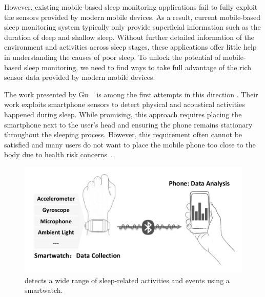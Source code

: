 However, existing mobile-based sleep monitoring applications fail to fully exploit the sensors provided by modern mobile devices. As a
result, current mobile-based sleep monitoring system typically only provide superficial information such as the duration of deep and
shallow sleep. Without further detailed information of the environment and activities across sleep stages, these applications offer little
help in understanding the causes of poor sleep. To unlock the potential of mobile-based sleep monitoring, we need to find ways to take full
advantage of the rich sensor data provided by modern mobile devices.


The work presented by Gu \etal~\cite{gu2016sleep} is among the first attempts in this direction
\cite{lawson2013validating,bauer2012shuteye,min2014toss,al2014classifying}. Their work exploits smartphone sensors to detect physical and acoustical activities happened during sleep. While promising, this approach requires placing the smartphone next to the user's head and
ensuring the phone remains stationary throughout the sleeping process. However, this requirement often cannot be satisfied and many users
do not want to place the mobile phone too close to the body due to health risk concerns~\cite{StepHealth,Quorasleep}.

\begin{figure}[!t]
\centering
\setlength{\belowcaptionskip}{-13pt}
      \includegraphics[width=0.87\linewidth]{Figures/datacollect.pdf}
  \caption{{\systemname} detects a wide range of sleep-related activities and events using a smartwatch.}\label{fig:datacollect}
\end{figure}

